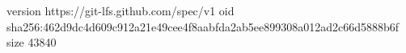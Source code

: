 version https://git-lfs.github.com/spec/v1
oid sha256:462d9dc4d609c912a21e49cee4f8aabfda2ab5ee899308a012ad2c66d5888b6f
size 43840
